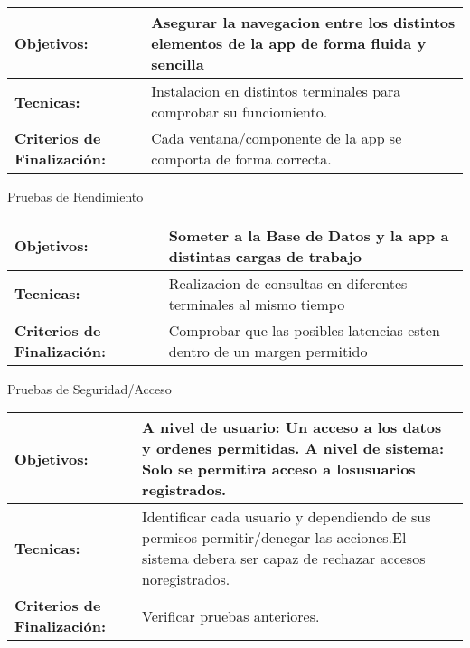 \begin{center}
   \begin{tabular}{|p{5cm}|p{10cm}|}
     \hline
     \textbf{Objetivos:} & Asegurar la navegacion entre los distintos elementos de la app de forma fluida y sencilla  \\ \hline
     \textbf{Tecnicas:} & Instalacion en distintos terminales para comprobar su funciomiento. \\ \hline
     \textbf{Criterios de \newline Finalización:} & Cada ventana/componente de la app se comporta de forma correcta.  \\ \hline
   \end{tabular}
\end{center}

Pruebas de Rendimiento

\begin{center}
   \begin{tabular}{|p{5cm}|p{10cm}|}
     \hline
     \textbf{Objetivos:} & Someter a la Base de Datos y la app a distintas cargas de trabajo  \\ \hline
     \textbf{Tecnicas:} & Realizacion de consultas en diferentes terminales al \newline mismo tiempo  \\ \hline
     \textbf{Criterios de \newline Finalización:} & Comprobar que las posibles latencias esten dentro de un margen permitido \\ \hline
   \end{tabular}
\end{center}

\newpage
Pruebas de Seguridad/Acceso

\begin{center}
   \begin{tabular}{|p{5cm}|p{10cm}|}
     \hline
     \textbf{Objetivos:} & A nivel de usuario: Un acceso a los datos y ordenes \newline permitidas.\newline
     A nivel de sistema: Solo se permitira acceso a los\newline usuarios registrados. \\ \hline
     \textbf{Tecnicas:} & Identificar cada usuario y dependiendo de sus permisos permitir/denegar las acciones.\newline El sistema debera ser capaz de rechazar accesos no\newline registrados.  \\ \hline
     \textbf{Criterios de \newline Finalización:} & Verificar pruebas anteriores. \\ \hline
   \end{tabular}
\end{center}

